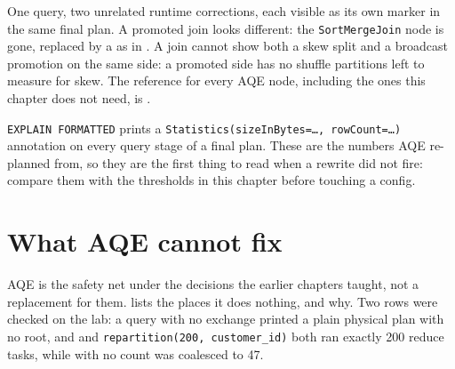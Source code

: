 One query, two unrelated runtime corrections, each visible as its own marker in
the same final plan. A promoted join looks different: the \texttt{SortMergeJoin}
node is gone, replaced by a  as in
. A join cannot show both a skew split and a
broadcast promotion on the same side: a promoted side has no shuffle partitions
left to measure for skew. The reference for every AQE node, including the ones
this chapter does not need, is .

\begin{tip}
\texttt{EXPLAIN FORMATTED} prints a \texttt{Statistics(sizeInBytes=\ldots,
rowCount=\ldots)} annotation on every query stage of a final plan. These are the
numbers AQE re-planned from, so they are the first thing to read when a rewrite
did not fire: compare them with the thresholds in this chapter before touching
a config.
\end{tip}

\section{What AQE cannot fix}
\label{sec:aqe-limits}

AQE is the safety net under the decisions the earlier chapters taught, not a
replacement for them.  lists the places it does nothing, and
why. Two rows were checked on the lab: a query with no exchange printed a plain
physical plan with no  root, and
 and \texttt{repartition(200, customer\_id)} both ran
exactly 200 reduce tasks, while  with no count
was coalesced to 47.

